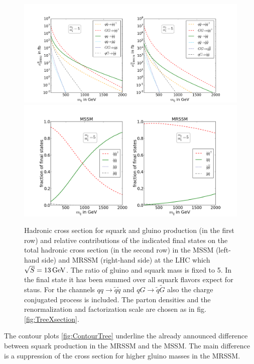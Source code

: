 \begin{figure}[!htpb]
\begin{center}
\includegraphics[scale=.4]{figures/mr=5_MSSM+MRSSM}
\includegraphics[scale=.45]{figures/rel_weights_mr=5_MSSM+MRSSM}
\caption{Hadronic cross section for squark and gluino production (in the first row) and relative contributions of the indicated final states on the total hadronic cross section (in the second row) in the MSSM (left-hand side) and MRSSM (right-hand side) at the LHC which $\sqrt{S} = \unit[13]{GeV}$. The ratio of gluino and squark mass is fixed to 5. In the final state it has been summed over all squark flavors expect for staus. For the channels $qq \to \tilde{q}\tilde{q}$ and $qG \to \tilde{q}\tilde{G}$ also the charge conjugated process is included. The parton densities and the renormalization and factorization scale are chosen as in fig. \ref{fig:TreeXsection}.}\label{fig:TreeXsection5}
\end{center}
\end{figure}
The contour plots \ref{fig:ContourTree} underline the already announced difference between squark production in the MRSSM and the MSSM. The main difference is a suppression of the cross section for higher gluino masses in the MRSSM.

